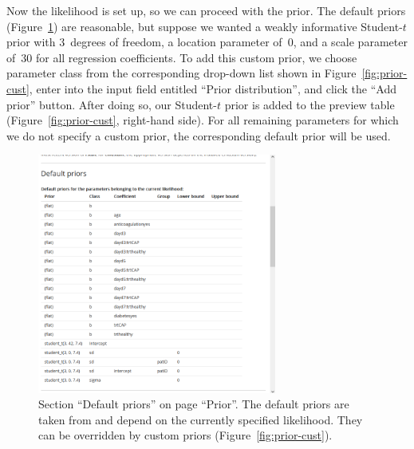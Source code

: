 Now the likelihood is set up, so we can proceed with the prior. The default
priors (Figure~\ref{fig:prior-def}) are reasonable, but suppose we wanted a
weakly informative Student-$t$ prior with $3$~degrees of freedom, a location
parameter of~$0$, and a scale parameter of~$30$ for all regression
coefficients. To add this custom prior, we choose parameter class 
from the corresponding drop-down list shown in Figure~\ref{fig:prior-cust},
enter  into the input field entitled ``Prior
distribution'', and click the ``Add prior'' button. After doing so, our
Student-$t$ prior is added to the preview table (Figure~\ref{fig:prior-cust},
right-hand side). For all remaining parameters for which we do not specify a
custom prior, the corresponding default prior will be used.
\begin{figure}[t!]
  \centering
  \includegraphics[width=0.7\textwidth]{Figures/Prior_Default.png}
  \caption[Section ``Default priors'']{Section ``Default priors'' on page ``Prior''.
  The default priors are taken from  and depend on the currently specified
  likelihood. They can be overridden by custom priors (Figure~\ref{fig:prior-cust}).}
  \label{fig:prior-def}
\end{figure}%
